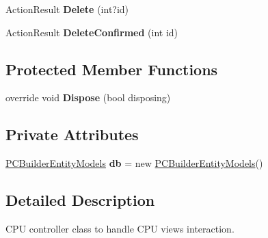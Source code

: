 \begin{DoxyCompactItemize}
\item 
Action\+Result {\bfseries Delete} (int?id)\hypertarget{class_p_c_builder_m_v_c_1_1_controllers_1_1_c_p_u_controller_aecf48e4974303f62bfc5df8ffee64c7b}{}\label{class_p_c_builder_m_v_c_1_1_controllers_1_1_c_p_u_controller_aecf48e4974303f62bfc5df8ffee64c7b}

\item 
Action\+Result {\bfseries Delete\+Confirmed} (int id)\hypertarget{class_p_c_builder_m_v_c_1_1_controllers_1_1_c_p_u_controller_aae1ff81c3b6e4e5ba3b1ac03106a7ed2}{}\label{class_p_c_builder_m_v_c_1_1_controllers_1_1_c_p_u_controller_aae1ff81c3b6e4e5ba3b1ac03106a7ed2}

\end{DoxyCompactItemize}
\subsection*{Protected Member Functions}
\begin{DoxyCompactItemize}
\item 
override void {\bfseries Dispose} (bool disposing)\hypertarget{class_p_c_builder_m_v_c_1_1_controllers_1_1_c_p_u_controller_a3b3148ca684258dc2d3a75ef1abc005e}{}\label{class_p_c_builder_m_v_c_1_1_controllers_1_1_c_p_u_controller_a3b3148ca684258dc2d3a75ef1abc005e}

\end{DoxyCompactItemize}
\subsection*{Private Attributes}
\begin{DoxyCompactItemize}
\item 
\hyperlink{class_p_c_builder_m_v_c_1_1_models_1_1_p_c_builder_entity_models}{P\+C\+Builder\+Entity\+Models} {\bfseries db} = new \hyperlink{class_p_c_builder_m_v_c_1_1_models_1_1_p_c_builder_entity_models}{P\+C\+Builder\+Entity\+Models}()\hypertarget{class_p_c_builder_m_v_c_1_1_controllers_1_1_c_p_u_controller_a77284533fab5d9ff56207220384cadf7}{}\label{class_p_c_builder_m_v_c_1_1_controllers_1_1_c_p_u_controller_a77284533fab5d9ff56207220384cadf7}

\end{DoxyCompactItemize}


\subsection{Detailed Description}
C\+PU controller class to handle C\+PU views interaction. 

